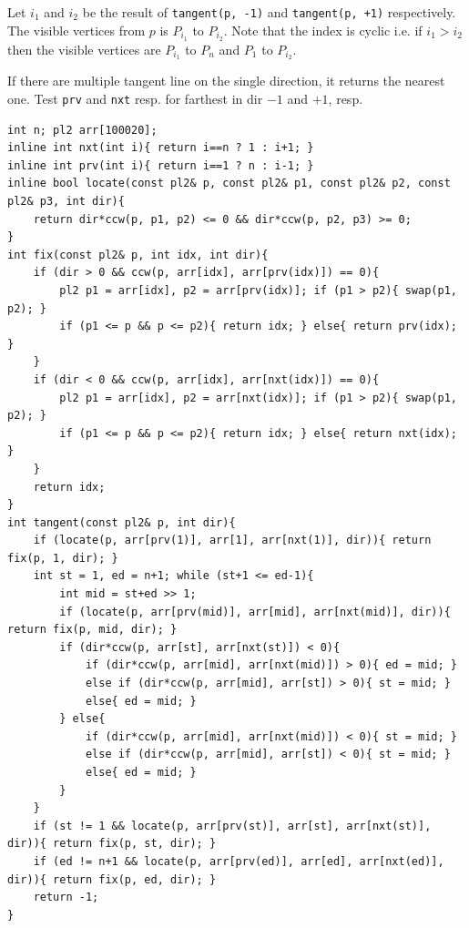 Let $i_1$ and $i_2$ be the result of \texttt{tangent(p, -1)} and \texttt{tangent(p, +1)} respectively. The visible vertices from $p$ is $P_{i_1}$ to $P_{i_2}$.
Note that the index is cyclic i.e. if $i_1 > i_2$ then the visible vertices are $P_{i_1}$ to $P_n$ and $P_1$ to $P_{i_2}$.

If there are multiple tangent line on the single direction, it returns the nearest one. Test \texttt{prv} and \texttt{nxt} resp. for farthest in dir $-1$ and $+1$, resp.
\begin{verbatim}
int n; pl2 arr[100020];
inline int nxt(int i){ return i==n ? 1 : i+1; }
inline int prv(int i){ return i==1 ? n : i-1; }
inline bool locate(const pl2& p, const pl2& p1, const pl2& p2, const pl2& p3, int dir){
	return dir*ccw(p, p1, p2) <= 0 && dir*ccw(p, p2, p3) >= 0;
}
int fix(const pl2& p, int idx, int dir){
	if (dir > 0 && ccw(p, arr[idx], arr[prv(idx)]) == 0){
		pl2 p1 = arr[idx], p2 = arr[prv(idx)]; if (p1 > p2){ swap(p1, p2); }
		if (p1 <= p && p <= p2){ return idx; } else{ return prv(idx); }
	}
	if (dir < 0 && ccw(p, arr[idx], arr[nxt(idx)]) == 0){
		pl2 p1 = arr[idx], p2 = arr[nxt(idx)]; if (p1 > p2){ swap(p1, p2); }
		if (p1 <= p && p <= p2){ return idx; } else{ return nxt(idx); }
	}
	return idx;
}
int tangent(const pl2& p, int dir){
	if (locate(p, arr[prv(1)], arr[1], arr[nxt(1)], dir)){ return fix(p, 1, dir); }
	int st = 1, ed = n+1; while (st+1 <= ed-1){
		int mid = st+ed >> 1;
		if (locate(p, arr[prv(mid)], arr[mid], arr[nxt(mid)], dir)){ return fix(p, mid, dir); }
		if (dir*ccw(p, arr[st], arr[nxt(st)]) < 0){
			if (dir*ccw(p, arr[mid], arr[nxt(mid)]) > 0){ ed = mid; }
			else if (dir*ccw(p, arr[mid], arr[st]) > 0){ st = mid; }
			else{ ed = mid; }
		} else{
			if (dir*ccw(p, arr[mid], arr[nxt(mid)]) < 0){ st = mid; }
			else if (dir*ccw(p, arr[mid], arr[st]) < 0){ st = mid; }
			else{ ed = mid; }
		}
	}
	if (st != 1 && locate(p, arr[prv(st)], arr[st], arr[nxt(st)], dir)){ return fix(p, st, dir); }
	if (ed != n+1 && locate(p, arr[prv(ed)], arr[ed], arr[nxt(ed)], dir)){ return fix(p, ed, dir); }
	return -1;
}
\end{verbatim}